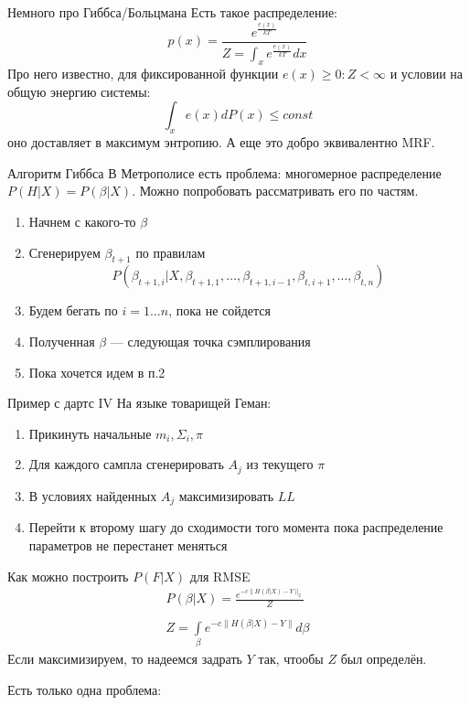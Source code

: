 \documentclass[14pt, fleqn, xcolor={dvipsnames, table}]{beamer}
\begin{document}
\begin{frame}{Немного про Гиббса/Больцмана}
Есть такое распределение:
$$
p(x) = \frac{e^\frac{e(x)}{kT}}{Z = \int_x e^\frac{e(x)}{kT} dx}
$$
Про него известно, для фиксированной функции $e(x) \ge 0: Z < \infty$ и условии на общую энергию системы:
$$
\int_x e(x) dP(x) \le const
$$
оно доставляет в максимум энтропию. А еще это добро эквивалентно MRF.
\end{frame}
\begin{frame}{Алгоритм Гиббса}
В Метрополисе есть проблема: многомерное распределение $P(H|X) = P(\beta|X)$. Можно попробовать рассматривать его по частям.
\begin{enumerate}
  \item Начнем с какого-то $\beta$
  \item Сгенерируем $\beta_{t+1}$ по правилам
$$
P(\beta_{t + 1,i} | X, \beta_{t+1,1},\ldots,\beta_{t+1, i-1}, \beta_{t, i+1},\ldots, \beta_{t,n})
$$
  \item Будем бегать по $i=1\ldots n$, пока не сойдется
  \item Полученная $\beta$ --- следующая точка сэмплирования
  \item Пока хочется идем в п.2
\end{enumerate}
\end{frame}

\begin{frame}{Пример с дартс IV}
\small
На языке товарищей Геман:
\begin{enumerate}
  \item Прикинуть начальные $m_i, \Sigma_i, \pi$
  \item Для каждого сампла сгенерировать $A_j$ из текущего $\pi$
  \item В условиях найденных $A_j$ максимизировать $LL$
  \item Перейти к второму шагу до сходимости того момента пока распределение параметров не перестанет меняться
\end{enumerate}
\end{frame}

\begin{frame}{Как можно построить $P(F|X)$ для RMSE}
$$\begin{array}{l}
P(\beta|X) = \frac{e^{-c\|H(\beta|X) - Y\|_2}}{Z} \\
\\
Z = \int\limits_{\beta} e^{-c\|H(\beta|X) - Y\|}d\beta
\end{array}$$
Если максимизируем, то надеемся задрать $Y$ так, чтообы $Z$ был определён. 

Есть только одна проблема: 
\end{frame}
\end{document}
